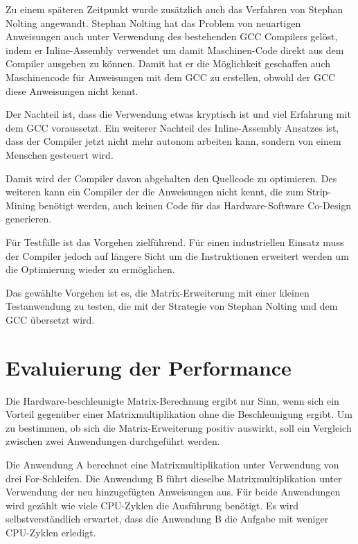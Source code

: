 Zu einem späteren Zeitpunkt wurde zusätzlich auch das Verfahren von Stephan Nolting angewandt. Stephan Nolting hat das Problem von neuartigen Anweisungen auch unter Verwendung des bestehenden GCC Compilers gelöst, indem er Inline-Assembly verwendet um damit Maschinen-Code direkt aus dem Compiler ausgeben zu können. Damit hat er die Möglichkeit geschaffen auch Maschinencode für Anweisungen mit dem GCC zu erstellen, obwohl der GCC diese Anweisungen nicht kennt.

Der Nachteil ist, dass die Verwendung etwas kryptisch ist und viel Erfahrung mit dem GCC voraussetzt. Ein weiterer Nachteil des Inline-Assembly Ansatzes ist, dass der Compiler jetzt nicht mehr autonom arbeiten kann, sondern von einem Menschen gesteuert wird.

Damit wird der Compiler davon abgehalten den Quellcode zu optimieren. Des weiteren kann ein Compiler der die Anweisungen nicht kennt, die zum Strip-Mining benötigt werden, auch keinen Code für das Hardware-Software Co-Design generieren.

Für Testfälle ist das Vorgehen zielführend. Für einen industriellen Einsatz muss der Compiler jedoch auf längere Sicht um die Instruktionen erweitert werden um die Optimierung wieder zu ermöglichen.

Das gewählte Vorgehen ist es, die Matrix-Erweiterung mit einer kleinen Testanwendung zu testen, die mit der Strategie von Stephan Nolting und dem GCC übersetzt wird.





\section{Evaluierung der Performance} \label{sec:eval_performance}

Die Hardware-beschleunigte Matrix-Berechnung ergibt nur Sinn, wenn sich ein Vorteil gegenüber einer Matrixmultiplikation ohne die Beschleunigung ergibt. Um zu bestimmen, ob sich die Matrix-Erweiterung positiv auswirkt, soll ein Vergleich zwischen zwei Anwendungen durchgeführt werden.

Die Anwendung A berechnet eine Matrixmultiplikation unter Verwendung von drei For-Schleifen. Die Anwendung B führt dieselbe Matrixmultiplikation unter Verwendung der neu hinzugefügten Anweisungen aus. Für beide Anwendungen wird gezählt wie viele CPU-Zyklen die Ausführung benötigt. Es wird selbstverständlich erwartet, dass die Anwendung B die Aufgabe mit weniger CPU-Zyklen erledigt.


